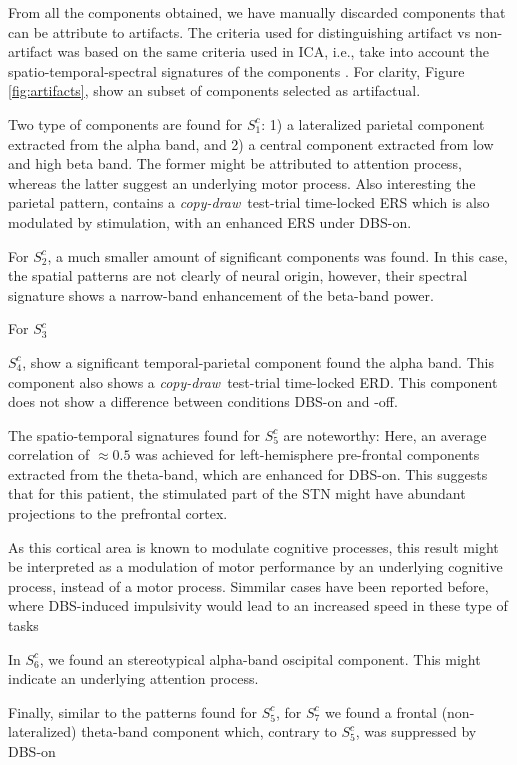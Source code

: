 \documentclass[10pt,a4paper, twocolumn]{article}
\newcommand{\cpdt}[0]{\textit{copy-draw}~test\xspace}
\newcommand{\patient}[2]{$S_{#1}^{#2}$}
\begin{document}
From all the components obtained, we have manually discarded components that can be attribute to artifacts. The criteria used for distinguishing artifact vs non-artifact was based on the same criteria used in ICA, i.e., take into account the spatio-temporal-spectral signatures of the components \cite{MARAOrSimilarHowToIdentifyArtifacts}. For clarity, Figure \ref{fig:artifacts}, show an subset of components selected as artifactual.

Two type of components are found for \patient{1}{c}: 1) a lateralized parietal component extracted from the alpha band, and 2) a central component extracted from low and high beta band. The former might be attributed to attention process, whereas the latter suggest an underlying motor process. Also interesting the parietal pattern, contains a \cpdt-trial time-locked ERS which is also modulated by stimulation, with an enhanced ERS under DBS-on. 

For \patient{2}{c}, a much smaller amount of significant components was found. In this case, the spatial patterns are not clearly of neural origin, however, their spectral signature shows a narrow-band enhancement of the beta-band power.

For \patient{3}{c} 

\patient{4}{c}, show a significant temporal-parietal component found the alpha band. This component also shows a \cpdt-trial time-locked ERD. This component does not show a difference between conditions DBS-on and -off.

The spatio-temporal signatures found for \patient{5}{c} are noteworthy: Here, an average correlation of $\approx0.5$ was achieved for left-hemisphere pre-frontal components extracted from the theta-band, which are enhanced for DBS-on. This suggests that for this patient, the stimulated part of the STN might have abundant projections to the prefrontal cortex.

As this cortical area is known to modulate cognitive processes, this result might be interpreted as a modulation of motor performance by an underlying cognitive process, instead of a motor process. Simmilar cases have been reported before, where DBS-induced impulsivity would lead to an increased speed in these type of tasks \cite{IMPULSIVITY DBS}

In \patient{6}{c}, we found an stereotypical alpha-band oscipital component. This might indicate an underlying attention process. 

Finally, similar to the patterns found for \patient{5}{c}, for \patient{7}{c} we found a frontal (non-lateralized) theta-band component which, contrary to \patient{5}{c}, was suppressed by DBS-on
\end{document}
